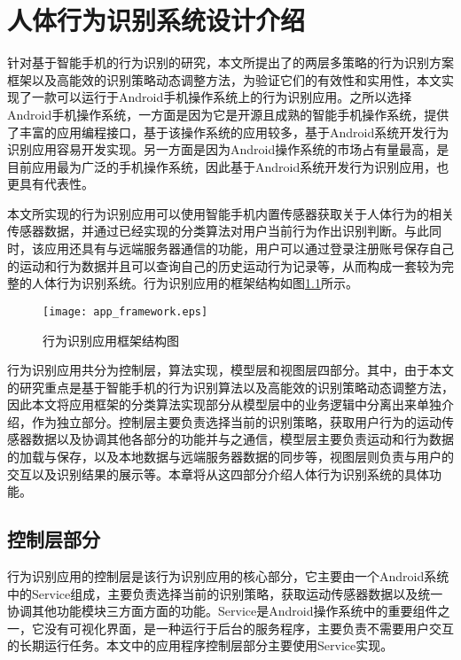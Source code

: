 \chapter{人体行为识别系统设计介绍}
\par 针对基于智能手机的行为识别的研究，本文所提出了的两层多策略的行为识别方案框架以及高能效的识别策略动态调整方法，为验证它们的有效性和实用性，本文实现了一款可以运行于Android手机操作系统上的行为识别应用。之所以选择Android手机操作系统，一方面是因为它是开源且成熟的智能手机操作系统，提供了丰富的应用编程接口，基于该操作系统的应用较多，基于Android系统开发行为识别应用容易开发实现。另一方面是因为Android操作系统的市场占有量最高，是目前应用最为广泛的手机操作系统，因此基于Android系统开发行为识别应用，也更具有代表性。
\par 本文所实现的行为识别应用可以使用智能手机内置传感器获取关于人体行为的相关传感器数据，并通过已经实现的分类算法对用户当前行为作出识别判断。与此同时，该应用还具有与远端服务器通信的功能，用户可以通过登录注册账号保存自己的运动和行为数据并且可以查询自己的历史运动行为记录等，从而构成一套较为完整的人体行为识别系统。行为识别应用的框架结构如图\ref{app_framework}所示。
\begin{figure}[htb]
\centering
\texttt{[image: app\_framework.eps]}
\caption{行为识别应用框架结构图}\label{app_framework}
\end{figure}
\par 行为识别应用共分为控制层，算法实现，模型层和视图层四部分。其中，由于本文的研究重点是基于智能手机的行为识别算法以及高能效的识别策略动态调整方法，因此本文将应用框架的分类算法实现部分从模型层中的业务逻辑中分离出来单独介绍，作为独立部分。控制层主要负责选择当前的识别策略，获取用户行为的运动传感器数据以及协调其他各部分的功能并与之通信，模型层主要负责运动和行为数据的加载与保存，以及本地数据与远端服务器数据的同步等，视图层则负责与用户的交互以及识别结果的展示等。本章将从这四部分介绍人体行为识别系统的具体功能。


\section{控制层部分}
行为识别应用的控制层是该行为识别应用的核心部分，它主要由一个Android系统中的Service组成，主要负责选择当前的识别策略，获取运动传感器数据以及统一协调其他功能模块三方面方面的功能。Service是Android操作系统中的重要组件之一，它没有可视化界面，是一种运行于后台的服务程序，主要负责不需要用户交互的长期运行任务。本文中的应用程序控制层部分主要使用Service实现。

